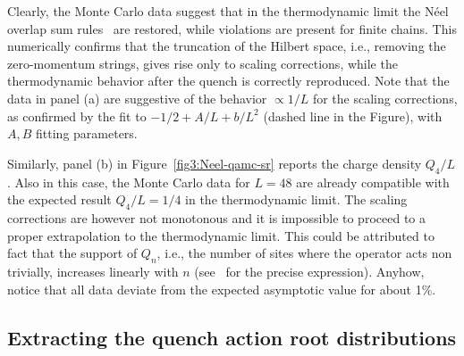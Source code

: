 \documentclass[11pt]{iopart}
\begin{document}
Clearly, the Monte Carlo data suggest that in the thermodynamic limit the N\'eel 
overlap sum rules~ are restored, while violations are present for 
finite chains. This numerically confirms that the truncation of the Hilbert space, 
i.e., removing the zero-momentum strings, gives rise only to scaling corrections, 
while the thermodynamic behavior after the quench is correctly reproduced. 
Note that the data in panel (a) are suggestive  of the behavior $\propto 1/L$ for 
the scaling corrections, as confirmed by the fit to $-1/2+A/L+b/L^2$ (dashed line in the Figure), 
with $A,B$ fitting parameters.  


Similarly, panel (b) in Figure~\ref{fig3:Neel-qamc-sr} reports the charge 
density $Q_4/L$. Also in this case, the Monte 
Carlo data for $L=48$ are already compatible with the expected result $Q_4/L=1/4$ 
in the thermodynamic limit. 
The scaling corrections  are however not monotonous and it is impossible to 
proceed to a proper extrapolation to the thermodynamic limit. 
This could be attributed to fact that the support of $Q_n$, i.e., the number of 
sites where the operator acts non trivially, increases linearly with $n$ 
(see~\cite{grabowski-1995} for the precise expression). 
Anyhow, notice that all data deviate from the expected asymptotic value for about 1\%. 

\subsection{Extracting the quench action root distributions}
\label{sec:6.3}
\end{document}
